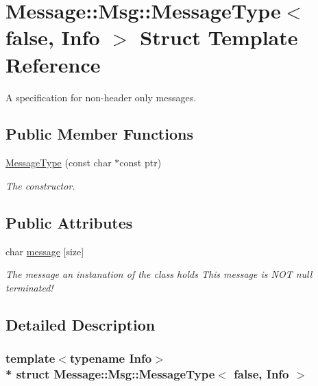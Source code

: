 \hypertarget{struct_message_1_1_msg_1_1_message_type_3_01false_00_01_info_01_4}{}\section{Message\+:\+:Msg\+:\+:Message\+Type$<$ false, Info $>$ Struct Template Reference}
\label{struct_message_1_1_msg_1_1_message_type_3_01false_00_01_info_01_4}


A specification for non-\/header only messages.  


\subsection*{Public Member Functions}
\begin{DoxyCompactItemize}
\item 
\hyperlink{struct_message_1_1_msg_1_1_message_type_3_01false_00_01_info_01_4_a81f148929319c2b03cc46779af945bfb}{Message\+Type} (const char $\ast$const ptr)
\begin{DoxyCompactList}\small\item\em The constructor. \end{DoxyCompactList}\end{DoxyCompactItemize}
\subsection*{Public Attributes}
\begin{DoxyCompactItemize}
\item 
char \hyperlink{struct_message_1_1_msg_1_1_message_type_3_01false_00_01_info_01_4_a285ad1635e73a096386e61fc965a6038}{message} \mbox{[}size\mbox{]}
\begin{DoxyCompactList}\small\item\em The message an instanation of the class holds This message is N\+OT null terminated! \end{DoxyCompactList}\end{DoxyCompactItemize}


\subsection{Detailed Description}
\subsubsection*{template$<$typename Info$>$\\*
struct Message\+::\+Msg\+::\+Message\+Type$<$ false, Info $>$}

